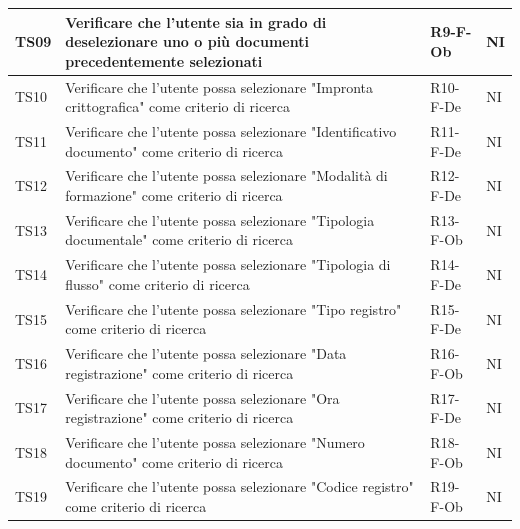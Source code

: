 \documentclass[a4paper,12pt]{article}
\begin{document}
\begin{longtable}{|M{1.2cm}|M{6.3cm}|M{2.5cm}|M{1.5cm}|}
                TS09 & Verificare che l'utente sia in grado di deselezionare uno o più documenti precedentemente selezionati & R9-F-Ob & NI \\
                \hline

                TS10 & Verificare che l'utente possa selezionare "Impronta crittografica" come criterio di ricerca & R10-F-De & NI \\
                \hline

                TS11 & Verificare che l'utente possa selezionare "Identificativo documento" come criterio di ricerca & R11-F-De & NI \\
                \hline

                TS12 & Verificare che l'utente possa selezionare "Modalità di formazione" come criterio di ricerca & R12-F-De & NI \\
                \hline

                TS13 & Verificare che l'utente possa selezionare "Tipologia documentale" come criterio di ricerca & R13-F-Ob & NI \\
                \hline

                TS14 & Verificare che l'utente possa selezionare "Tipologia di flusso" come criterio di ricerca & R14-F-De & NI \\
                \hline

                TS15 & Verificare che l'utente possa selezionare "Tipo registro" come criterio di ricerca & R15-F-De & NI \\
                \hline
               
                TS16 & Verificare che l'utente possa selezionare "Data registrazione" come criterio di ricerca & R16-F-Ob & NI \\
                \hline
                
                TS17 & Verificare che l'utente possa selezionare "Ora registrazione" come criterio di ricerca & R17-F-De & NI \\
                \hline
                
                TS18 & Verificare che l'utente possa selezionare "Numero documento" come criterio di ricerca & R18-F-Ob & NI \\
                \hline

                TS19 & Verificare che l'utente possa selezionare "Codice registro" come criterio di ricerca & R19-F-Ob & NI \\
                \hline
                

\end{longtable}
\end{document}
